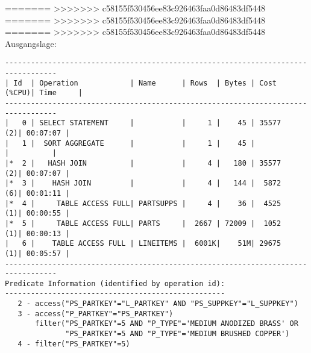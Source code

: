 \documentclass[10pt]{article}
\begin{document}
=======
>>>>>>> c58155f530456ee83c926463faa0d86483df5448
=======
>>>>>>> c58155f530456ee83c926463faa0d86483df5448
=======
>>>>>>> c58155f530456ee83c926463faa0d86483df5448
Ausgangslage:
\begin{lstlisting}[style=queryexecutionplan]
----------------------------------------------------------------------------------
| Id  | Operation            | Name      | Rows  | Bytes | Cost (%CPU)| Time     |
----------------------------------------------------------------------------------
|   0 | SELECT STATEMENT     |           |     1 |    45 | 35577   (2)| 00:07:07 |
|   1 |  SORT AGGREGATE      |           |     1 |    45 |            |          |
|*  2 |   HASH JOIN          |           |     4 |   180 | 35577   (2)| 00:07:07 |
|*  3 |    HASH JOIN         |           |     4 |   144 |  5872   (6)| 00:01:11 |
|*  4 |     TABLE ACCESS FULL| PARTSUPPS |     4 |    36 |  4525   (1)| 00:00:55 |
|*  5 |     TABLE ACCESS FULL| PARTS     |  2667 | 72009 |  1052   (1)| 00:00:13 |
|   6 |    TABLE ACCESS FULL | LINEITEMS |  6001K|    51M| 29675   (1)| 00:05:57 |
----------------------------------------------------------------------------------
Predicate Information (identified by operation id):
--------------------------------------------------- 
   2 - access("PS_PARTKEY"="L_PARTKEY" AND "PS_SUPPKEY"="L_SUPPKEY")
   3 - access("P_PARTKEY"="PS_PARTKEY")
       filter("PS_PARTKEY"=5 AND "P_TYPE"='MEDIUM ANODIZED BRASS' OR 
              "PS_PARTKEY"=5 AND "P_TYPE"='MEDIUM BRUSHED COPPER')
   4 - filter("PS_PARTKEY"=5)
\end{lstlisting}
\end{document}

